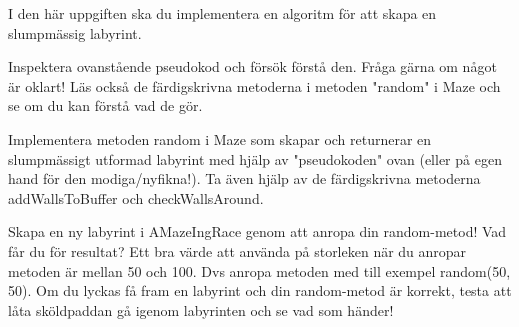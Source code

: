 

\Task I den här uppgiften ska du implementera en algoritm för att skapa en slumpmässig labyrint.

\Subtask Inspektera ovanstående pseudokod och försök förstå den. Fråga gärna om något är oklart! Läs också de färdigskrivna metoderna i metoden "random" i Maze och se om du kan förstå vad de gör.

\Subtask Implementera metoden random i Maze som skapar och returnerar en slumpmässigt utformad labyrint med hjälp av "pseudokoden" ovan (eller på egen hand för den modiga/nyfikna!). Ta även hjälp av de färdigskrivna metoderna addWallsToBuffer och checkWallsAround.

\Subtask Skapa en ny labyrint i AMazeIngRace genom att anropa din random-metod! Vad får du för resultat? Ett bra värde att använda på storleken när du anropar metoden är mellan 50 och 100. Dvs anropa metoden med till exempel random(50, 50). Om du lyckas få fram en labyrint och din random-metod är korrekt, testa att låta sköldpaddan gå igenom labyrinten och se vad som händer!
    
